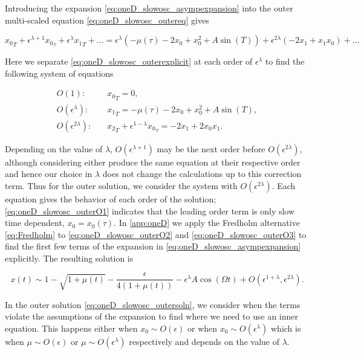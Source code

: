 Introducing the expansion \eqref{eq:oneD_slowosc_asympexpansion} into the outer multi-scaled equation \eqref{eq:oneD_slowosc_outereq} gives 

\begin{equation}\label{eq:oneD_slowosc_outerexplicit}
{x_0}_T+\epsilon^{\lambda+1}{x_0}_\tau+\epsilon^\lambda {x_1}_T+\ldots=\epsilon^\lambda(-\mu(\tau)-2x_0+x_0^2+A\sin(T))+\epsilon^{2\lambda}(-2x_1+x_1x_0)+\ldots
\end{equation}

Here we separate \eqref{eq:oneD_slowosc_outerexplicit} at each order of $\epsilon^\lambda$ to find the following system of equations

\begin{align}
\label{eq:oneD_slowosc_outerO1}
O(1):\quad & {x_0}_T=0, \\
\label{eq:oneD_slowosc_outerO2}
O(\epsilon^\lambda):\quad& {x_1}_T=-\mu(\tau)-2x_0+x_0^2+A\sin(T),\\
\label{eq:oneD_slowosc_outerO3}
O(\epsilon^{2\lambda}):\quad& {x_2}_T+\epsilon^{1-\lambda}{x_0}_\tau= -2x_1+2x_0x_1.
\end{align}

Depending on the value of $\lambda$, $O(\epsilon^{\lambda+1})$ may be the next order before $O(\epsilon^{2\lambda})$, although considering either produce the same equation at their respective order and hence our choice in $\lambda$ does not change the calculations up to this correction term. Thus for the outer solution, we consider the system with $O(\epsilon^{2\lambda})$. Each equation gives the behavior of each order of the solution; \eqref{eq:oneD_slowosc_outerO1} indicates that the leading order term is only slow time dependent, $x_0=x_0(\tau)$. In \autoref{app:oneD} we apply the Fredholm alternative \eqref{eq:Fredholm} to \eqref{eq:oneD_slowosc_outerO2} and \eqref{eq:oneD_slowosc_outerO3} to find the first few terms of the expansion in \eqref{eq:oneD_slowosc_asympexpansion} explicitly. The resulting solution is

\begin{equation}\label{eq:oneD_slowosc_outersoln}
x(t)\sim 1-\sqrt{1+\mu(t)}-\frac{\epsilon}{4(1+\mu(t))}-\epsilon^\lambda A \cos(\Omega t)+O(\epsilon^{1+\lambda},\epsilon^{2\lambda}).
\end{equation}

In the outer solution \eqref{eq:oneD_slowosc_outersoln}, we consider when the terms violate the assumptions of the expansion to find where we need to use an inner equation. This happens either when $x_0\sim O(\epsilon)$ or when $x_0\sim O(\epsilon^\lambda)$ which is when $\mu\sim O(\epsilon)$ or $\mu\sim O(\epsilon^\lambda)$ respectively and depends on the value of $\lambda$.

